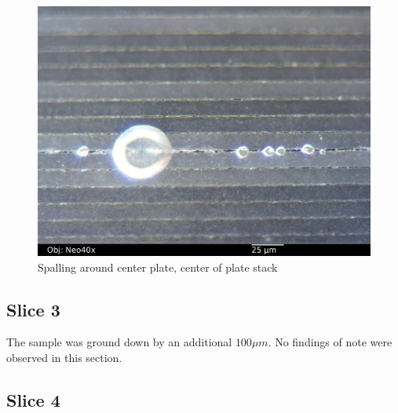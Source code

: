 \documentclass{article}
\begin{document}
\begin{figure}[h]
\includegraphics[width=12cm,keepaspectratio]{section2_10_df_neo40x_annotated.jpg}
\caption{Spalling around center plate, center of plate stack}
\label{spalling3}
\end{figure}

\FloatBarrier
\subsection{Slice 3}
The sample was ground down by an additional $100 \mu m$. No findings of note were observed in this section.

\subsection{Slice 4}
\end{document}

